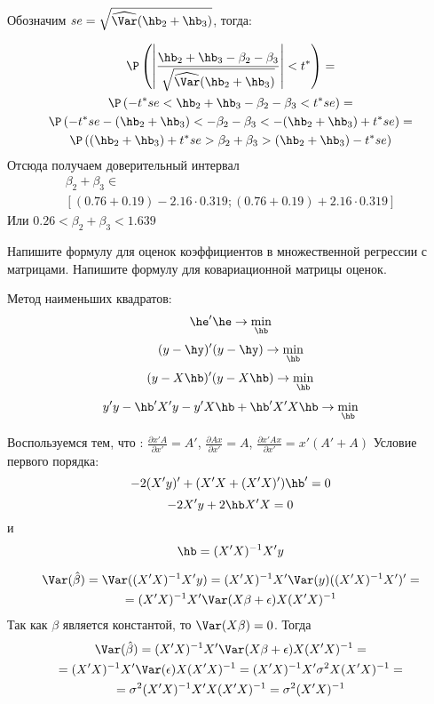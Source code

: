 \documentclass[pdftex,11pt,openany]{book}\usepackage[]{graphicx}\usepackage[]{color}
\begin{document}
\begin{solution}
\begin{enumerate}
Обозначим $se=\sqrt{\widehat{\Var}(\hb_2 + \hb_3)}$, тогда:

\begin{multline}
\P \left( \left| \frac{\hb_2 + \hb_3 - \beta_2 - \beta_3}{\sqrt{\widehat{\Var}(\hb_2 + \hb_3)}} \right| < t^* \right) = \\
\P \left( -t^* se < \hb_2 + \hb_3 - \beta_2 - \beta_3 < t^* se \right) = \\ 
\P \left( -t^*se  - (\hb_2 + \hb_3) < - \beta_2 - \beta_3  < -(\hb_2 + \hb_3) + t^* se \right) =\\ 
\P \left( (\hb_2 + \hb_3) + t^* se 
> \beta_2 + \beta_3 
> (\hb_2 + \hb_3) - t^* se \right) 
\end{multline}
Отсюда получаем доверительный интервал
\begin{multline}
\beta_2 + \beta_3 \in \\
[(0.76 + 0.19) - 2.16 \cdot 0.319;  (0.76 + 0.19) + 2.16 \cdot 0.319 ]
\end{multline}
Или $0.26< \beta_2 + \beta_3  < 1.639  $
\end{enumerate}
\end{solution}


\begin{problem}
Напишите формулу для оценок коэффициентов в множественной регрессии с матрицами. Напишите формулу для ковариационной матрицы оценок.
\end{problem}

\begin{solution}

Метод наименьших квадратов:
\[\he'\he\rightarrow \min_{\hb}\]
\[(y-\hy)'(y-\hy)\rightarrow\min_{\hb}\]
\[(y-X\hb)'(y-X\hb)\rightarrow\min_{\hb}\]
\[y'y-\hb' X'y-y'X\hb+\hb'X'X\hb\rightarrow\min_{\hb}\]

Воспользуемся тем, что : $\frac{\partial x'A}{\partial x'}=A'$, $\frac{\partial Ax}{\partial x'}=A$,
$\frac{\partial x'Ax}{\partial x'}=x'(A'+A)$
Условие первого порядка:
\[-2(X'y)'+(X'X+(X'X)')\hb'=0\]
\[-2X'y+2\hb X'X=0\]
и
\[\hb=(X'X)^{-1}X'y\]

\begin{multline*}
\Var(\hat\beta)=\Var((X'X)^{-1}X'y)=(X'X)^{-1}X'\Var(y)((X'X)^{-1}X')'=\\
=(X'X)^{-1}X'\Var(X\beta+\epsilon)X(X'X)^{-1}
\end{multline*}
Так как $\beta$ является константой, то $\Var(X\beta)=0$. Тогда 
\begin{multline*}
\Var(\hat\beta)=(X'X)^{-1}X'\Var(X\beta+\epsilon)X(X'X)^{-1}=\\=(X'X)^{-1}X'\Var(\epsilon)X(X'X)^{-1}=
(X'X)^{-1}X'\sigma^2X(X'X)^{-1}=\\=\sigma^2(X'X)^{-1}X'X(X'X)^{-1}=\sigma^2(X'X)^{-1}
\end{multline*}
\end{solution}
\end{document}
